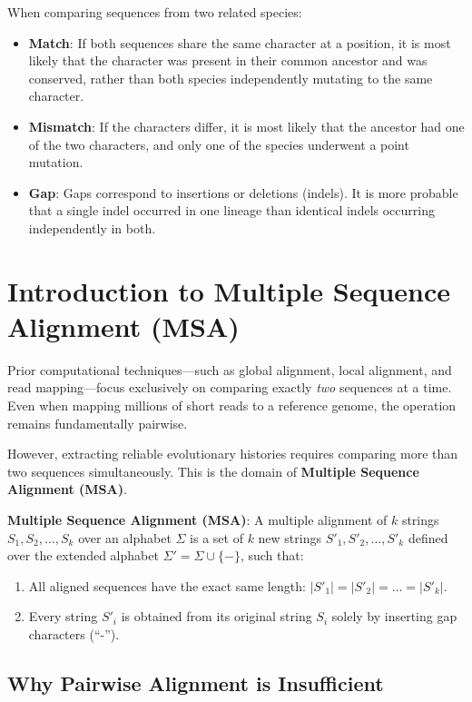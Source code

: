 When comparing sequences from two related species:
\begin{itemize}
    \item \textbf{Match}: If both sequences share the same character at a position, it is most likely that the character was present in their common ancestor and was conserved, rather than both species independently mutating to the same character.
    \item \textbf{Mismatch}: If the characters differ, it is most likely that the ancestor had one of the two characters, and only one of the species underwent a point mutation.
    \item \textbf{Gap}: Gaps correspond to insertions or deletions (indels). It is more probable that a single indel occurred in one lineage than identical indels occurring independently in both.
\end{itemize}

\section{Introduction to Multiple Sequence Alignment (MSA)}

Prior computational techniques—such as global alignment, local alignment, and read mapping—focus exclusively on comparing exactly \textit{two} sequences at a time. Even when mapping millions of short reads to a reference genome, the operation remains fundamentally pairwise.

However, extracting reliable evolutionary histories requires comparing more than two sequences simultaneously. This is the domain of \textbf{Multiple Sequence Alignment (MSA)}.

\begin{important}
    \textbf{Multiple Sequence Alignment (MSA)}: A multiple alignment of $k$ strings $S_1, S_2, \dots, S_k$ over an alphabet $\Sigma$ is a set of $k$ new strings $S'_1, S'_2, \dots, S'_k$ defined over the extended alphabet $\Sigma' = \Sigma \cup \{-\}$, such that:
    \begin{enumerate}
        \item All aligned sequences have the exact same length: $|S'_1| = |S'_2| = \dots = |S'_k|$.
        \item Every string $S'_i$ is obtained from its original string $S_i$ solely by inserting gap characters (``-'').
    \end{enumerate}
\end{important}

\subsection{Why Pairwise Alignment is Insufficient}

